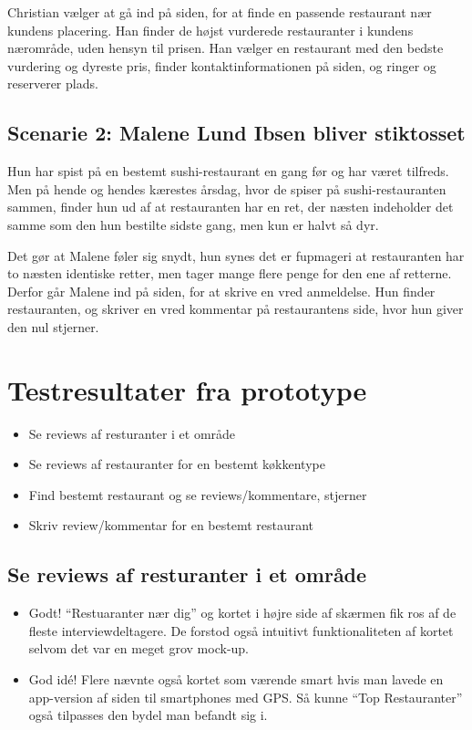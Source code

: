 \documentclass[a4paper, 12pt]{article}
\begin{document}
Christian vælger at gå ind på siden, for at finde en passende restaurant nær
kundens placering. Han finder de højst vurderede restauranter i kundens
nærområde, uden hensyn til prisen. Han vælger en restaurant med den bedste
vurdering og dyreste pris, finder kontaktinformationen på siden, og ringer og
reserverer plads.

\subsection{Scenarie 2: Malene Lund Ibsen bliver stiktosset}
\label{sub:Scenarie 2: Malene Lund Ibsen}

Hun har spist på en bestemt sushi-restaurant en gang før og har været tilfreds.
Men på hende og hendes kærestes årsdag, hvor de spiser på sushi-restauranten
sammen, finder hun ud af at restauranten har en ret, der næsten indeholder det
samme som den hun bestilte sidste gang, men kun er halvt så dyr.

Det gør at Malene føler sig snydt, hun synes det er fupmageri at restauranten
har to næsten identiske retter, men tager mange flere penge for den ene af
retterne. Derfor går Malene ind på siden, for at skrive en vred anmeldelse.  Hun
finder restauranten, og skriver en vred kommentar på restaurantens side, hvor
hun giver den nul stjerner.
\section{Testresultater fra prototype}
\label{sec:Testresultater fra prototype}

\begin{itemize}
\item Se reviews af resturanter i et område
\item Se reviews af restauranter for en bestemt køkkentype
\item Find bestemt restaurant og se reviews/kommentare, stjerner
\item Skriv review/kommentar for en bestemt restaurant
\end{itemize}

\subsection{Se reviews af resturanter i et område}
\begin{itemize}
\item Godt! ``Restuaranter nær dig'' og kortet i højre side af skærmen fik ros af de fleste interviewdeltagere. De forstod også intuitivt funktionaliteten af kortet selvom det var en meget grov mock-up.
\item God idé! Flere nævnte også kortet som værende smart hvis man lavede en app-version af siden til smartphones med GPS. Så kunne ``Top Restauranter'' også tilpasses den bydel man befandt sig i.
\end{itemize}
\end{document}
